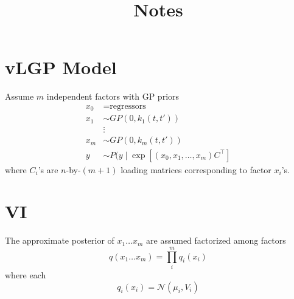 \documentclass{article}
\title{Notes}
\newcounter{ct}
\begin{document}
    
    \maketitle
    
    \section{vLGP Model}
    Assume $m$ independent factors with GP priors
    \begin{equation}
        \begin{aligned}
            x_0 &= \text{regressors} \\
            x_1 &\sim GP(0, k_1 (t, t')) \\
            &\vdots \\
            x_m &\sim GP(0, k_m (t, t')) \\
            y &\sim P(y \mid \exp\left[(x_0, x_1, 
            \ldots, x_m) C^\top\right]
        \end{aligned}    
    \end{equation}
    where $C_i$'s are $n$-by-$(m+1)$ loading matrices corresponding to factor $x_i$'s.

    \section{VI}
    The approximate posterior of $x_1 \ldots x_m$ are assumed factorized among factors
    \begin{equation}
        q(x_1 \ldots x_m) = \prod_i^m q_i(x_i)
    \end{equation}
    where each
    \begin{equation}
        q_i(x_i) = \mathcal{N}(\mu_i, V_i)
    \end{equation}   
\end{document}
